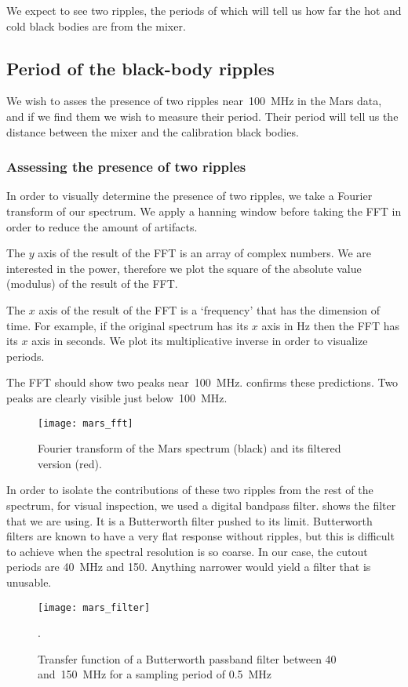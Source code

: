 We expect to see two ripples, the periods of which will tell us how far the hot and cold black bodies are from the mixer.



\subsection{Period of the black-body ripples}
We wish to asses the presence of two ripples near~\SI{100}{\mega\hertz} in the Mars data,
and if we find them we wish to measure their period.
Their period will tell us the distance between the mixer and the calibration black bodies.

\subsubsection{Assessing the presence of two ripples}
In order to visually determine the presence of two ripples, we take a Fourier transform of our spectrum.
We apply a hanning window before taking the FFT in order to reduce the amount of artifacts.

The $y$ axis of the result of the FFT is an array of complex numbers.
We are interested in the power, therefore we plot the square of the absolute value (modulus) of the result of the FFT.

The $x$ axis of the result of the FFT is a `frequency' that has the dimension of time.
For example, if the original spectrum has its $x$ axis in \si{\hertz} then the FFT has its $x$ axis in seconds.
We plot its multiplicative inverse in order to visualize periods.

The FFT should show two peaks near~\SI{100}{\mega\hertz}.
 confirms these predictions.
Two peaks are clearly visible just below~\SI{100}{\mega\hertz}.
\begin{figure}
    \centering
    \texttt{[image: mars\_fft]}
    \caption{Fourier transform of the Mars spectrum (black) and its filtered version (red).}
    \label{fig:mars_fft}
\end{figure}

In order to isolate the contributions of these two ripples from the rest of the spectrum, for visual inspection, we used a digital bandpass filter.
 shows the filter that we are using.
It is a Butterworth filter pushed to its limit.
Butterworth filters are known to have a very flat response without ripples, but this is difficult to achieve when the spectral resolution is so coarse.
In our case, the cutout periods are \SI{40}{\mega\hertz} and \SI{150}{\megahertz}.
Anything narrower would yield a filter that is unusable.
\begin{figure}
    \centering
    \texttt{[image: mars\_filter]}
    \caption{Transfer function of a Butterworth passband filter between 40 and~\SI{150}{\mega\hertz} for a sampling period of \SI{0.5}{\mega\hertz}}.
    \label{fig:mars_filter}
\end{figure}

